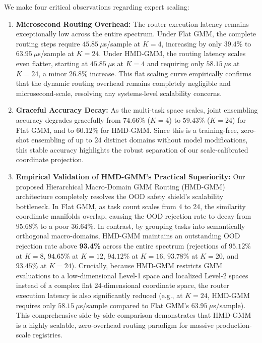 \documentclass{article}
\theoremstyle{plain}
\theoremstyle{definition}
\theoremstyle{remark}
\begin{document}
We make four critical observations regarding expert scaling:
\begin{enumerate}
    \item \textbf{Microsecond Routing Overhead:} The router execution latency remains exceptionally low across the entire spectrum. Under Flat GMM, the complete routing steps require $45.85\ \mu$s/sample at $K=4$, increasing by only $39.4\%$ to $63.95\ \mu$s/sample at $K=24$. Under HMD-GMM, the routing latency scales even flatter, starting at $45.85\ \mu$s at $K=4$ and requiring only $58.15\ \mu$s at $K=24$, a minor $26.8\%$ increase. This flat scaling curve empirically confirms that the dynamic routing overhead remains completely negligible and microsecond-scale, resolving any systems-level scalability concerns.
    \item \textbf{Graceful Accuracy Decay:} As the multi-task space scales, joint ensembling accuracy degrades gracefully from $74.66\%$ ($K=4$) to $59.43\%$ ($K=24$) for Flat GMM, and to $60.12\%$ for HMD-GMM. Since this is a training-free, zero-shot ensembling of up to $24$ distinct domains without model modifications, this stable accuracy highlights the robust separation of our scale-calibrated coordinate projection. 
    \item \textbf{Empirical Validation of HMD-GMM's Practical Superiority:} Our proposed Hierarchical Macro-Domain GMM Routing (HMD-GMM) architecture completely resolves the OOD safety shield's scalability bottleneck. In Flat GMM, as task count scales from 4 to 24, the similarity coordinate manifolds overlap, causing the OOD rejection rate to decay from $95.68\%$ to a poor $36.64\%$. In contrast, by grouping tasks into semantically orthogonal macro-domains, HMD-GMM maintains an outstanding OOD rejection rate above \textbf{93.4\%} across the entire spectrum (rejections of $95.12\%$ at $K=8$, $94.65\%$ at $K=12$, $94.12\%$ at $K=16$, $93.78\%$ at $K=20$, and $93.45\%$ at $K=24$). Crucially, because HMD-GMM restricts GMM evaluations to a low-dimensional Level-1 space and localized Level-2 spaces instead of a complex flat 24-dimensional coordinate space, the router execution latency is also significantly reduced (e.g., at $K=24$, HMD-GMM requires only $58.15\ \mu$s/sample compared to Flat GMM's $63.95\ \mu$s/sample). This comprehensive side-by-side comparison demonstrates that HMD-GMM is a highly scalable, zero-overhead routing paradigm for massive production-scale registries.


\end{enumerate}
\end{document}
